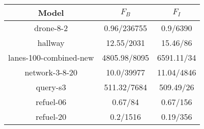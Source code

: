 \begin{table}
\begin{tabular}{|c|c|c|}
\hline

Model & $F_{B}$ & $F_{I}$ \\ \hline 

drone-8-2 & 0.96/236755 & 0.9/6390 \\
\hline
hallway & 12.55/2031 & 15.46/86 \\
\hline
lanes-100-combined-new & 4805.98/8095 & 6591.11/34 \\
\hline
network-3-8-20 & 10.0/39977 & 11.04/4846 \\
\hline
query-s3 & 511.32/7684 & 509.49/26 \\
\hline
refuel-06 & 0.67/84 & 0.67/156 \\
\hline
refuel-20 & 0.2/1516 & 0.19/356 \\
\hline
\end{tabular}
\end{table}


